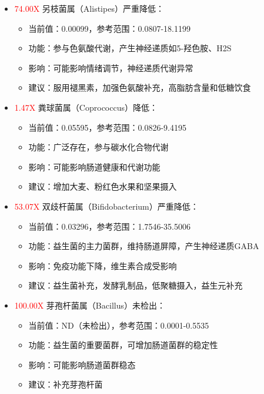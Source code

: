 \documentclass[UTF8]{ctexart}
\begin{document}
\begin{tcolorbox}[
    enhanced,
    colback=gray!3,
    colframe=gray!3,
    arc=3mm,
    boxrule=0pt,
    width=\textwidth,
    top=8pt,
    bottom=8pt
]
{\begin{itemize}
    \item {\textcolor{red}{74.00X}} 另枝菌属（Alistipes）严重降低：
    \begin{itemize}
        \item 当前值：0.00099，参考范围：0.0807-18.1199
        \item 功能：参与色氨酸代谢，产生神经递质如5-羟色胺、H2S
        \item 影响：可能影响情绪调节，神经递质代谢异常
        \item 建议：服用褪黑素，加强色氨酸补充，高脂肪含量和低糖饮食
    \end{itemize}

    \item {\textcolor{red}{1.47X}} 粪球菌属（Coprococcus）降低：
    \begin{itemize}
        \item 当前值：0.05595，参考范围：0.0826-9.4195
        \item 功能：广泛存在，参与碳水化合物代谢
        \item 影响：可能影响肠道健康和代谢功能
        \item 建议：增加大麦、粉红色水果和坚果摄入
    \end{itemize}

    \item {\textcolor{red}{53.07X}} 双歧杆菌属（Bifidobacterium）严重降低：
    \begin{itemize}
        \item 当前值：0.03296，参考范围：1.7546-35.5006
        \item 功能：益生菌的主力菌群，维持肠道屏障，产生神经递质GABA
        \item 影响：免疫功能下降，维生素合成受影响
        \item 建议：益生菌补充，发酵乳制品，低聚糖摄入，益生元补充
    \end{itemize}

    \item {\textcolor{red}{100.00X}} 芽孢杆菌属（Bacillus）未检出：
    \begin{itemize}
        \item 当前值：ND（未检出），参考范围：0.0001-0.5535
        \item 功能：益生菌的重要菌群，可增加肠道菌群的稳定性
        \item 影响：可能影响肠道菌群稳态
        \item 建议：补充芽孢杆菌
    \end{itemize}
\end{itemize}

}
\end{tcolorbox}
\end{document}

